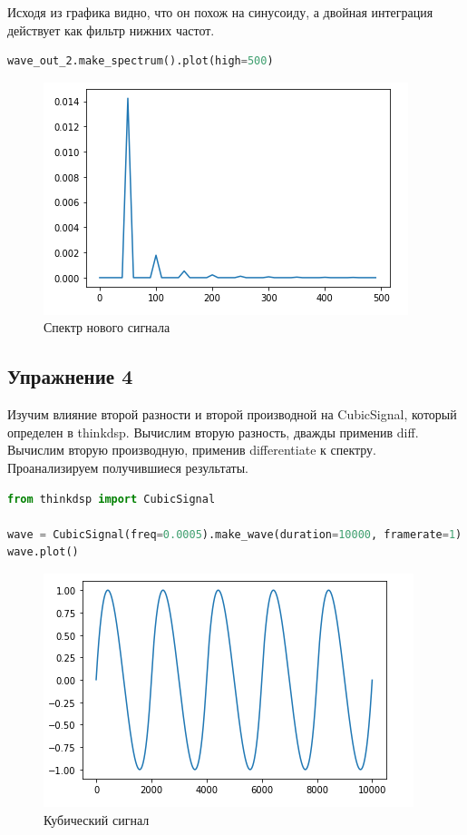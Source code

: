 Исходя из графика видно, что он похож на синусоиду, а двойная интеграция действует как фильтр нижних частот.

\begin{lstlisting}[language=Python]
wave_out_2.make_spectrum().plot(high=500)
\end{lstlisting}

\begin{figure}[H]
	\begin{center}
		\includegraphics[scale=1]{fig/lab09/lab09_11.png}
		\caption{Спектр нового сигнала}
	\end{center}
\end{figure}


\subsection{Упражнение 4}

Изучим влияние второй разности и второй производной на CubicSignal, который определен в thinkdsp. Вычислим вторую разность, дважды применив diff. Вычислим вторую производную, применив differentiate к спектру. Проанализируем получившиеся результаты.

\begin{lstlisting}[language=Python]
from thinkdsp import CubicSignal

wave = CubicSignal(freq=0.0005).make_wave(duration=10000, framerate=1)
wave.plot()
\end{lstlisting}

\begin{figure}[H]
	\begin{center}
		\includegraphics[scale=1]{fig/lab09/lab09_12.png}
		\caption{Кубический сигнал}
	\end{center}
\end{figure}

